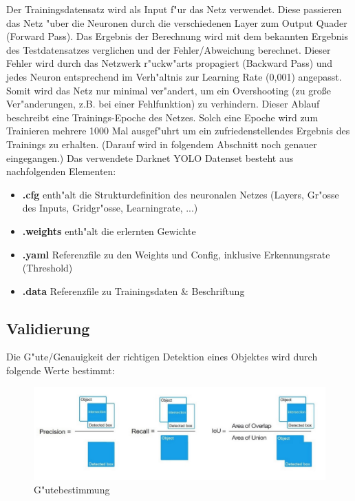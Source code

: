 Der Trainingsdatensatz wird als Input f"ur das Netz verwendet. Diese passieren das Netz "uber die Neuronen durch die verschiedenen Layer zum Output Quader (Forward Pass). Das Ergebnis der Berechnung wird mit dem bekannten Ergebnis des Testdatensatzes verglichen und der Fehler/Abweichung berechnet. Dieser Fehler wird durch das Netzwerk r"uckw"arts propagiert (Backward Pass) und jedes Neuron entsprechend im Verh"altnis zur Learning Rate (0,001) angepasst. Somit wird das Netz nur minimal ver"andert, um ein Overshooting (zu gro\ss e Ver"anderungen, z.B. bei einer Fehlfunktion) zu verhindern. Dieser Ablauf beschreibt eine Trainings-Epoche des Netzes.  Solch eine Epoche wird zum Trainieren mehrere 1000 Mal ausgef"uhrt um ein zufriedenstellendes Ergebnis des Trainings zu erhalten. (Darauf wird in folgendem Abschnitt noch genauer eingegangen.) Das verwendete Darknet YOLO Datenset besteht aus nachfolgenden Elementen:

\begin{itemize}
	\item \textbf{.cfg} enth"alt die Strukturdefinition des neuronalen Netzes (Layers, Gr"osse des Inputs, Gridgr"osse, Learningrate, ...)
	\item \textbf{.weights} enth"alt die erlernten Gewichte
	\item \textbf{.yaml} Referenzfile zu den Weights und Config, inklusive Erkennungsrate (Threshold)
	\item \textbf{.data} Referenzfile zu Trainingsdaten \& Beschriftung
\end{itemize}

\subsection{Validierung}
Die G"ute/Genauigkeit der richtigen Detektion eines Objektes wird durch folgende Werte bestimmt:

\begin{figure}[h]
	\centering
	\includegraphics[width=1.0\textwidth]{images/genauigkeit}
	\caption{G"utebestimmung}
	\label{fig:genauigkeit}
\end{figure}

